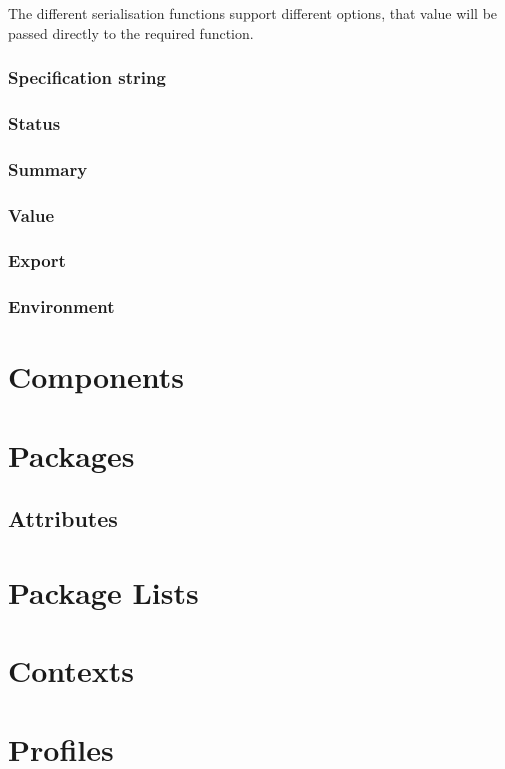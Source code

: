 \documentclass[11pt,a4paper,titlepage]{article}
\begin{document}
The different serialisation functions support different options, that
value will be passed directly to the required function.

\subsubsection{Specification string}

\subsubsection{Status}

\subsubsection{Summary}

\subsubsection{Value}

\subsubsection{Export}

\subsubsection{Environment}

\section{Components}

\section{Packages}

\subsection{Attributes}

\section{Package Lists}

\section{Contexts}

\section{Profiles}
\end{document}
